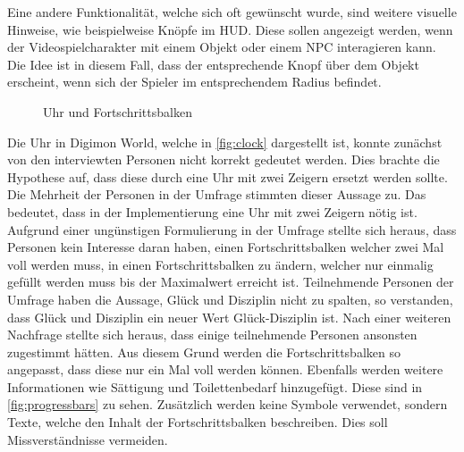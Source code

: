 Eine andere Funktionalität, welche sich oft gewünscht wurde, sind weitere visuelle Hinweise, wie beispielweise Knöpfe im \ac{HUD}. Diese sollen angezeigt werden, wenn der Videospielcharakter mit einem Objekt oder einem \ac{NPC} interagieren kann. Die Idee ist in diesem Fall, dass der entsprechende Knopf über dem Objekt erscheint, wenn sich der Spieler im entsprechendem Radius befindet.\\

\begin{figure}[H]%
    \centering
    \qquad
    \caption{Uhr und Fortschrittsbalken}%
    \label{fig:clock-progress}%
\end{figure}

Die Uhr in Digimon World, welche in \autoref{fig:clock} dargestellt ist, konnte zunächst von den interviewten Personen nicht korrekt gedeutet werden. Dies brachte die Hypothese auf, dass diese durch eine Uhr mit zwei Zeigern ersetzt werden sollte. Die Mehrheit der Personen in der Umfrage stimmten dieser Aussage zu. Das bedeutet, dass in der Implementierung eine Uhr mit zwei Zeigern nötig ist. \\

Aufgrund einer ungünstigen Formulierung in der Umfrage stellte sich heraus, dass Personen kein Interesse daran haben, einen Fortschrittsbalken welcher zwei Mal voll werden muss, in einen Fortschrittsbalken zu ändern, welcher nur einmalig gefüllt werden muss bis der Maximalwert erreicht ist. Teilnehmende Personen der Umfrage haben die Aussage, Glück und Disziplin nicht zu spalten, so verstanden, dass Glück und Disziplin ein neuer Wert Glück-Disziplin ist. Nach einer weiteren Nachfrage stellte sich heraus, dass einige teilnehmende Personen ansonsten zugestimmt hätten. Aus diesem Grund werden die Fortschrittsbalken so angepasst, dass diese nur ein Mal voll werden können. Ebenfalls werden weitere Informationen wie Sättigung und Toilettenbedarf hinzugefügt. Diese sind in \autoref{fig:progressbars} zu sehen. Zusätzlich werden keine Symbole verwendet, sondern Texte, welche den Inhalt der Fortschrittsbalken beschreiben. Dies soll Missverständnisse vermeiden.\\

